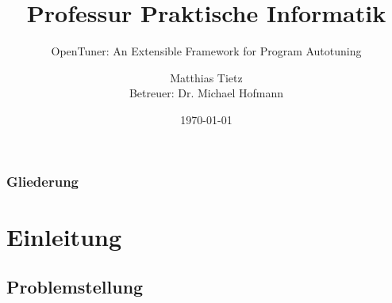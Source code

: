 
\usepackage[utf8]{inputenc}
\usepackage{babel}
\usepackage{floatflt}
 \usepackage{float}
\usepackage{graphics}


%
%


\title{Professur Praktische Informatik}
\subtitle{OpenTuner: An Extensible Framework for Program Autotuning}
\author{Matthias Tietz\\Betreuer: Dr. Michael Hofmann}


\date{\today}
\institute[TUC]


    \tucthreeheadlines
    \begin{frame}
      \titlepage
    \end{frame}

    \tucnarrowframe
    \begingroup

    \begin{frame}
      \frametitle{Gliederung}
      \tableofcontents
    \end{frame}

    \endgroup
    \tucwideframe
    \tuctwoheadlines

    

    \section{Einleitung}
    
    \subsection{Problemstellung}

